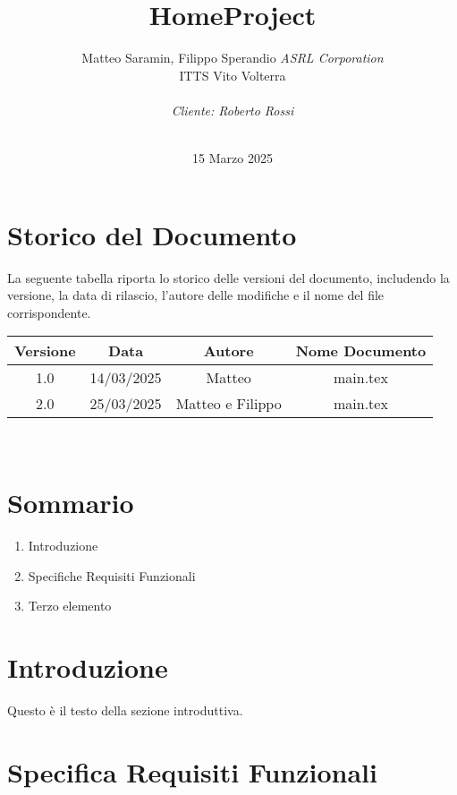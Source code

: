 \documentclass[italian, 12pt, a4paper]{article}
\title{HomeProject}
\author{Matteo Saramin, Filippo Sperandio \textit{ASRL Corporation} \\ {\small ITTS Vito Volterra} \\ \\ \emph{Cliente: Roberto Rossi}}
\date{\version\\ 15 Marzo 2025}
\begin{document}
\maketitle %

\section{Storico del Documento}
La seguente tabella riporta lo storico delle versioni del documento, includendo la versione, la data di rilascio, l'autore delle modifiche e il nome del file corrispondente.

\begin{center}
    \renewcommand{\arraystretch}{1.5} %
    \begin{tabular}{|c|c|c|c|}
        \hline
        \rowcolor{violet!30}
        Versione & Data & Autore & Nome Documento \\
        \hline
        1.0 & 14/03/2025 & Matteo & main.tex \\
        \hline
        2.0&25/03/2025&Matteo e Filippo & main.tex \\
        \hline
    \end{tabular}\\[4mm]
\end{center}
\vspace{15mm}
\section{Sommario}
\begin{enumerate}
    \item Introduzione
    \item Specifiche Requisiti Funzionali
    \item Terzo elemento
\end{enumerate}
\clearpage
\section{Introduzione}
Questo è il testo della sezione introduttiva.
\vspace{20mm}
\section{Specifica Requisiti Funzionali}
\end{document}
